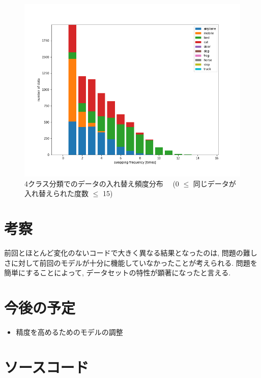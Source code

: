 \documentclass[twocolumn]{jarticle}     %
\begin{document}
\begin{figure}[tb]
	\begin{center}
		\includegraphics[clip,width=13cm]{swaptimes4.png}
		\caption{4クラス分類でのデータの入れ替え頻度分布　
    (0 $\leq$ 同じデータが入れ替えられた度数 $\leq$ 15)
    }
		\label{fig:swaptimes}
	\end{center}
\end{figure}

\section{考察}
前回とほとんど変化のないコードで大きく異なる結果となったのは, 問題の難しさに対して前回のモデルが十分に機能していなかったことが考えられる. 問題を簡単にすることによって, データセットの特性が顕著になったと言える.

\section{今後の予定}
\begin{itemize}
	\item {精度を高めるためのモデルの調整}
\end{itemize}

\section{ソースコード}





\end{document}
